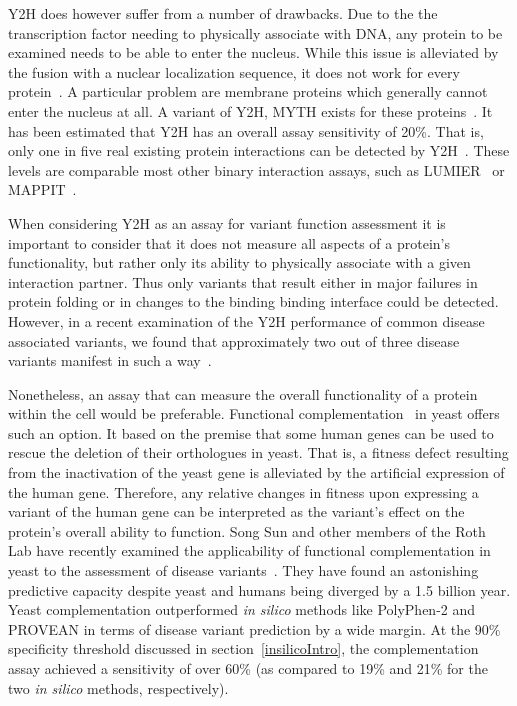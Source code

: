 Y2H does however suffer from a number of drawbacks. Due to the the transcription factor needing to physically associate with DNA, any protein to be examined needs to be able to enter the nucleus. While this issue is alleviated by the fusion with a nuclear localization sequence, it does not work for every protein~\cite{Y2Hnls}. A particular problem are membrane proteins which generally cannot enter the nucleus at all. A variant of Y2H, MYTH exists for these proteins~\cite{MYTH}. It has been estimated that Y2H has an overall assay sensitivity of 20\%. That is, only one in five real existing protein interactions can be detected by Y2H~\cite{Rual2012?}. These levels are comparable most other binary interaction assays, such as LUMIER~\cite{lumier} or MAPPIT~\cite{mappit}.

When considering Y2H as an assay for variant function assessment it is important to consider that it does not measure all aspects of a protein's functionality, but rather only its ability to physically associate with a given interaction partner. Thus only variants that result either in major failures in protein folding or in changes to the binding binding interface could be detected. However, in a recent examination of the Y2H performance of common disease associated variants, we found that approximately two out of three disease variants manifest in such a way~\cite{Sahni2015}. 


Nonetheless, an assay that can measure the overall functionality of a protein within the cell would be preferable. Functional complementation~\cite{complementation} in yeast offers such an option. It based on the premise that some human genes can be used to rescue the deletion of their orthologues in yeast. That is, a fitness defect resulting from the inactivation of the yeast gene is alleviated by the artificial expression of the human gene. Therefore, any relative changes in fitness upon expressing a variant of the human gene can be interpreted as the variant's effect on the protein's overall ability to function. Song Sun and other members of the Roth Lab have recently examined the applicability of functional complementation in yeast to the assessment of disease variants~\cite{sun_extended_2016}. They have found an astonishing predictive capacity despite yeast and humans being diverged by a 1.5 billion year. Yeast complementation outperformed \textit{in silico} methods like PolyPhen-2 and PROVEAN in terms of disease variant prediction by a wide margin. At the 90\% specificity threshold discussed in section~\ref{insilicoIntro}, the complementation assay achieved a sensitivity of over 60\% (as compared to 19\% and 21\% for the two \textit{in silico} methods, respectively).


